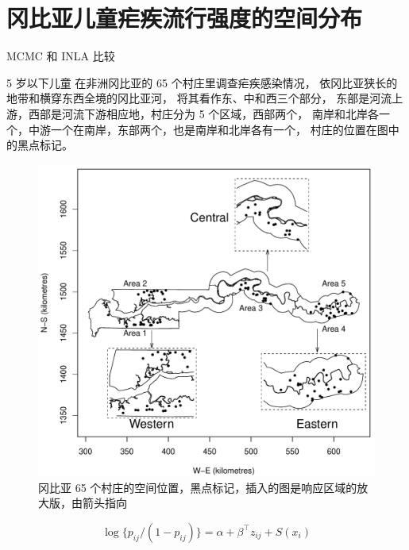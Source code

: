 \documentclass[12pt,a4paper,UTF8,twoside]{book}
\theoremstyle{definition}
\theoremstyle{definition}
\theoremstyle{definition}
\theoremstyle{remark}
\begin{document}
\section{冈比亚儿童疟疾流行强度的空间分布}

{MCMC 和 INLA 比较}

5 岁以下儿童 在非洲冈比亚的 65 个村庄里调查疟疾感染情况，
依冈比亚狭长的地带和横穿东西全境的冈比亚河，
将其看作东、中和西三个部分，
东部是河流上游，西部是河流下游相应地，村庄分为 5 个区域，西部两个，
南岸和北岸各一个，中游一个在南岸，东部两个，也是南岸和北岸各有一个，
村庄的位置在图中的黑点标记。

\begin{figure}

{\centering \includegraphics[width=0.7\linewidth]{figures/gambia-map} 

}

\caption{冈比亚 65 个村庄的空间位置，黑点标记，插入的图是响应区域的放大版，由箭头指向}\label{fig:childhood-malaria}
\end{figure}

\begin{equation}
\log\{p_{ij}/(1-p_{ij})\} = \alpha + \beta^{\top}z_{ij} + S(x_i) \label{eq:gambia-without-nugget-effect}
\end{equation}
\end{document}
